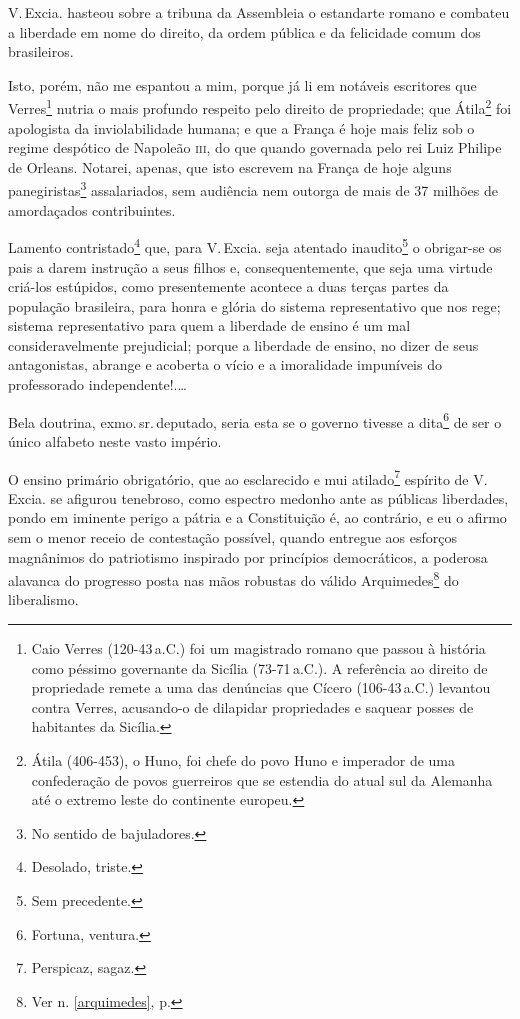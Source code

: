 V.\,Excia. hasteou sobre a tribuna da Assembleia o estandarte romano e
combateu a liberdade em nome do direito, da ordem pública e da
felicidade comum dos brasileiros.

Isto, porém, não me espantou a mim, porque já li em notáveis escritores
que Verres\footnote{Caio Verres (120-43\,a.C.) foi um magistrado romano
  que passou à história como péssimo governante da Sicília (73-71\,a.C.).
  A referência ao direito de propriedade remete a uma das denúncias que
  Cícero (106-43\,a.C.) levantou contra Verres, acusando-o de dilapidar
  propriedades e saquear posses de habitantes da Sicília.} nutria o mais
profundo respeito pelo direito de propriedade; que Átila\footnote{Átila (406-453), 
o Huno, foi chefe do povo Huno e imperador de uma
  confederação de povos guerreiros que se estendia do atual sul da
  Alemanha até o extremo leste do continente europeu.} foi apologista da
inviolabilidade humana; e que a França é hoje mais feliz sob o regime
despótico de Napoleão \textsc{iii}, do que quando governada pelo rei Luiz Philipe
de Orleans. Notarei, apenas, que isto escrevem na França de hoje alguns
panegiristas\footnote{No sentido de bajuladores.} assalariados, sem
audiência nem outorga de mais de 37 milhões de amordaçados
contribuintes.

Lamento contristado\footnote{Desolado, triste.} que, para V.\,Excia.
seja atentado inaudito\footnote{Sem precedente.} o obrigar-se os pais
a darem instrução a seus filhos e, consequentemente, que seja uma
virtude criá-los estúpidos, como presentemente acontece a duas terças
partes da população brasileira, para honra e glória do sistema
representativo que nos rege; sistema representativo para quem a
liberdade de ensino é um mal consideravelmente prejudicial; porque a
liberdade de ensino, no dizer de seus antagonistas, abrange e acoberta o
vício e a imoralidade impuníveis do professorado independente!.\ldots{}

Bela doutrina, exmo.\,sr.\,deputado, seria esta se o governo tivesse a
dita\footnote{Fortuna, ventura.} de ser o único alfabeto neste vasto
império.

O ensino primário obrigatório, que ao esclarecido e mui
atilado\footnote{Perspicaz, sagaz.} espírito de V.\,Excia. se afigurou
tenebroso, como espectro medonho ante as públicas liberdades, pondo em
iminente perigo a pátria e a Constituição é, ao contrário, e eu o afirmo
sem o menor receio de contestação possível, quando entregue aos esforços
magnânimos do patriotismo inspirado por princípios democráticos, a
poderosa alavanca do progresso posta nas mãos robustas do válido
Arquimedes\footnote{Ver n. \ref{arquimedes}, p. \pageref{arquimedes}} 
do liberalismo.

